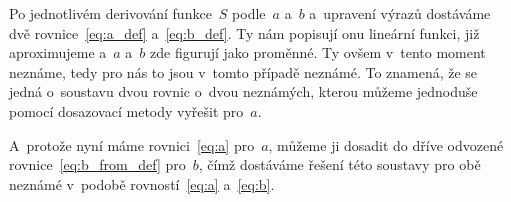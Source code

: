 Po jednotlivém derivování funkce~$S$ podle~$a$ a~$b$ a~upravení výrazů
dostáváme dvě rovnice~\eqref{eq:a_def} a~\eqref{eq:b_def}. Ty nám popisují onu
lineární funkci, již aproximujeme a~$a$ a~$b$ zde figurují jako proměnné. Ty
ovšem v~tento moment neznáme, tedy pro nás to jsou v~tomto případě neznámé.
To znamená, že se jedná o~soustavu dvou rovnic o~dvou neznámých, kterou můžeme
jednoduše pomocí dosazovací metody vyřešit pro~$a$.

A~protože nyní máme rovnici~\eqref{eq:a}  pro~$a$, můžeme ji dosadit do dříve
odvozené rovnice~\eqref{eq:b_from_def}  pro~$b$, čímž dostáváme řešení této
soustavy pro obě neznámé v~podobě rovností~\eqref{eq:a} a~\eqref{eq:b}.
